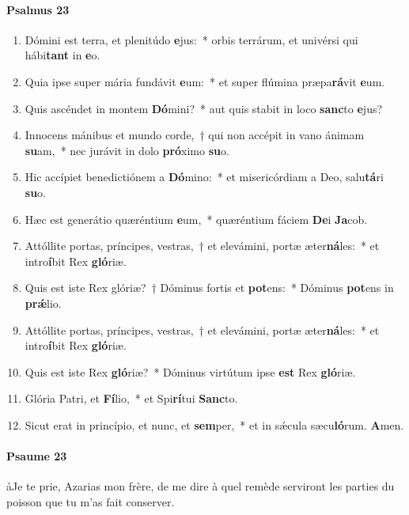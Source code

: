 \documentclass[twoside]{article}
\begin{document}
\begin{paracol}[1]{2}
\switchcolumn*

\paragraph{Psalmus 23}


\begin{enumerate}[wide, itemsep=0mm, labelwidth=!, labelindent=0pt, label=\color{gregoriocolor}\theenumi]
\item Dómini est terra, et plenitúdo \textbf{e}jus:~* orbis terrárum, et univérsi qui hábi\textbf{tant} in \textbf{e}o.
\item Quia ipse super mária fundávit \textbf{e}um:~* et super flúmina præpa\textbf{rá}vit \textbf{e}um.
\item Quis ascéndet in montem \textbf{Dó}mini?~* aut quis stabit in loco \textbf{sanc}to \textbf{e}jus?
\item Innocens mánibus et mundo corde,~† qui non accépit in vano ánimam \textbf{su}am,~* nec jurávit in dolo \textbf{pró}ximo \textbf{su}o.
\item Hic accípiet benedictiónem a \textbf{Dó}mino:~* et misericórdiam a Deo, salu\textbf{tá}ri \textbf{su}o.
\item Hæc est generátio quæréntium \textbf{e}um,~* quæréntium fáciem \textbf{De}i \textbf{Ja}cob.
\item Attóllite portas, príncipes, vestras,~† et elevámini, portæ æter\textbf{ná}les:~* et intro\textbf{í}bit Rex \textbf{gló}riæ.
\item Quis est iste Rex glóriæ?~† Dóminus fortis et \textbf{pot}ens:~* Dóminus \textbf{pot}ens in \textbf{prǽ}lio.
\item Attóllite portas, príncipes, vestras,~† et elevámini, portæ æter\textbf{ná}les:~* et intro\textbf{í}bit Rex \textbf{gló}riæ.
\item Quis est iste Rex \textbf{gló}riæ?~* Dóminus virtútum ipse \textbf{est} Rex \textbf{gló}riæ.
\item Glória Patri, et \textbf{Fí}lio,~* et Spi\textbf{rí}tui \textbf{Sanc}to.
\item Sicut erat in princípio, et nunc, et \textbf{sem}per,~* et in sǽcula sæcu\textbf{ló}rum. \textbf{A}men.
\end{enumerate}

\switchcolumn

\paragraph{Psaume 23}
\aa Je te prie, Azarias mon frère, de me dire à quel remède serviront les parties du poisson que tu m’as fait conserver.


\end{paracol}
\end{document}
